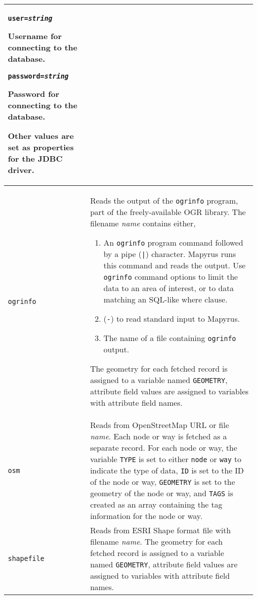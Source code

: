 \begin{longtable}{|p{3cm}|p{10cm}|}
\vspace{10pt}
\texttt{user=\textit{string}}

Username for connecting to the database.

\vspace{10pt}
\texttt{password=\textit{string}}

Password for connecting to the database.

\vspace{10pt}
Other values are set as properties for the JDBC driver. \\

\hline

\texttt{ogrinfo} &
Reads the output of the \texttt{ogrinfo} program, part of
the freely-available OGR library.
The filename \textit{name} contains either,
\begin{enumerate}
\item
An \texttt{ogrinfo} program command followed by a pipe (\texttt{|}) character.
Mapyrus runs this command and reads the output.  Use \texttt{ogrinfo}
command options to limit the data to an area of interest, or to data
matching an SQL-like where clause.
\item
(\texttt{-}) to read standard input to Mapyrus.
\item
The name of a file containing \texttt{ogrinfo} output.
\end{enumerate}

The geometry for each fetched record is assigned to a variable named
\texttt{GEOMETRY}, attribute field values are assigned to
variables with attribute field names. \\

\hline

\texttt{osm} &
Reads from OpenStreetMap URL or file \textit{name}.
Each node or way is fetched as a separate record.  For each node or way,
the variable \texttt{TYPE} is set to either \texttt{node}
or \texttt{way} to indicate the type of data, \texttt{ID}
is set to the ID of the node or way,
\texttt{GEOMETRY} is set to the geometry of the
node or way, and \texttt{TAGS} is created
as an array containing the tag information for the node
or way. \\

\hline

\texttt{shapefile} &
Reads from ESRI Shape format file with filename \textit{name}.
The geometry for each fetched record is assigned to a variable named
\texttt{GEOMETRY}, attribute field values are assigned to
variables with attribute field names.


\end{longtable}
